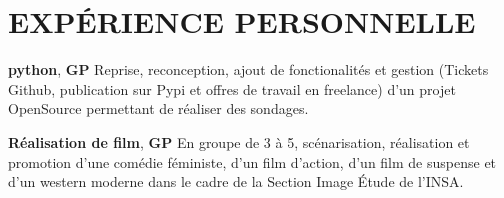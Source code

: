 \documentclass[11pt,a4paper]{moderncv}
\begin{document}






  \section{EXPÉRIENCE PERSONNELLE}

  \cvline
    {\textbf{python}, \textbf{GP}}
    {
      Reprise, reconception, ajout de fonctionalités et gestion (Tickets Github,
      publication sur Pypi et offres de travail en freelance) d'un projet
      OpenSource permettant de réaliser des sondages.
    }{}{}

  \cvline
    {\textbf{Réalisation de film}, \textbf{GP}}
    {
      En groupe de 3 à 5, scénarisation, réalisation et promotion d'une comédie
      féministe, d'un film d'action, d'un film de suspense et d'un western
      moderne dans le cadre de la Section Image Étude de l'INSA.
    }{}{}
\end{document}

